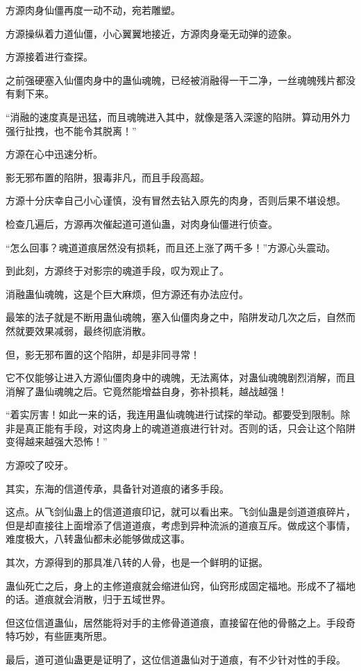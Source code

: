 \begin{this_body}
方源肉身仙僵再度一动不动，宛若雕塑。

方源操纵着力道仙僵，小心翼翼地接近，方源肉身毫无动弹的迹象。

方源接着进行查探。

之前强硬塞入仙僵肉身中的蛊仙魂魄，已经被消融得一干二净，一丝魂魄残片都没有剩下来。

“消融的速度真是迅猛，而且魂魄进入其中，就像是落入深邃的陷阱。算动用外力强行扯拽，也不能令其脱离！”

方源在心中迅速分析。

影无邪布置的陷阱，狠毒非凡，而且手段高超。

方源十分庆幸自己小心谨慎，没有冒然去钻入原先的肉身，否则后果不堪设想。

检查几遍后，方源再次催起道可道仙蛊，对肉身仙僵进行侦查。

“怎么回事？魂道道痕居然没有损耗，而且还上涨了两千多！”方源心头震动。

到此刻，方源终于对影宗的魂道手段，叹为观止了。

消融蛊仙魂魄，这是个巨大麻烦，但方源还有办法应付。

最笨的法子就是不断用蛊仙魂魄，塞入仙僵肉身之中，陷阱发动几次之后，自然而然就要效果减弱，最终彻底消散。

但，影无邪布置的这个陷阱，却是非同寻常！

它不仅能够让进入方源仙僵肉身中的魂魄，无法离体，对蛊仙魂魄剧烈消解，而且消解了蛊仙魂魄之后。它竟然能增益自身，弥补损耗，越战越强！

“着实厉害！如此一来的话，我连用蛊仙魂魄进行试探的举动。都要受到限制。除非是真正能有手段，对这肉身上的魂道道痕进行针对。否则的话，只会让这个陷阱变得越来越强大恐怖！”

方源咬了咬牙。

其实，东海的信道传承，具备针对道痕的诸多手段。

这点。从飞剑仙蛊上的信道道痕印记，就可以看出来。飞剑仙蛊是剑道道痕碎片，但是却直接往上面增添了信道道痕，考虑到异种流派的道痕互斥。做成这个事情，难度极大，八转蛊仙都未必能够做成这事。

其次，方源得到的那具准八转的人骨，也是一个鲜明的证据。

蛊仙死亡之后，身上的主修道痕就会缩进仙窍，仙窍形成固定福地。形成不了福地的话。道痕就会消散，归于五域世界。

但这位信道蛊仙，居然能将对手的主修骨道道痕，直接留在他的骨骼之上。手段奇特巧妙，有些匪夷所思。

最后，道可道仙蛊更是证明了，这位信道蛊仙对于道痕，有不少针对性的手段。


\end{this_body}
